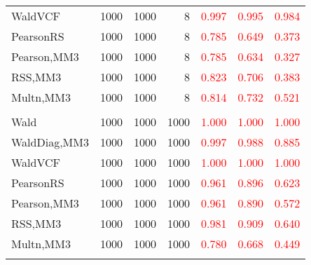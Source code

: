 \documentclass[
]{article}
\begin{document}
\begin{table}[H]
{\begin{tabular}[t]{lrrrrrr}
\hspace{1em}WaldVCF & 1000 & 1000 & 8 & \textcolor{red}{0.997} & \textcolor{red}{0.995} & \textcolor{red}{0.984}\\
\hspace{1em}PearsonRS & 1000 & 1000 & 8 & \textcolor{red}{0.785} & \textcolor{red}{0.649} & \textcolor{red}{0.373}\\
\hspace{1em}Pearson,MM3 & 1000 & 1000 & 8 & \textcolor{red}{0.785} & \textcolor{red}{0.634} & \textcolor{red}{0.327}\\
\hspace{1em}RSS,MM3 & 1000 & 1000 & 8 & \textcolor{red}{0.823} & \textcolor{red}{0.706} & \textcolor{red}{0.383}\\
\hspace{1em}Multn,MM3 & 1000 & 1000 & 8 & \textcolor{red}{0.814} & \textcolor{red}{0.732} & \textcolor{red}{0.521}\\
\addlinespace[0.3em]
\multicolumn{7}{l}{\textbf{1F 15V}}\\
\hspace{1em}Wald & 1000 & 1000 & 1000 & \textcolor{red}{1.000} & \textcolor{red}{1.000} & \vphantom{2} \textcolor{red}{1.000}\\
\hspace{1em}WaldDiag,MM3 & 1000 & 1000 & 1000 & \textcolor{red}{0.997} & \textcolor{red}{0.988} & \textcolor{red}{0.885}\\
\hspace{1em}WaldVCF & 1000 & 1000 & 1000 & \textcolor{red}{1.000} & \textcolor{red}{1.000} & \vphantom{1} \textcolor{red}{1.000}\\
\hspace{1em}PearsonRS & 1000 & 1000 & 1000 & \textcolor{red}{0.961} & \textcolor{red}{0.896} & \textcolor{red}{0.623}\\
\hspace{1em}Pearson,MM3 & 1000 & 1000 & 1000 & \textcolor{red}{0.961} & \textcolor{red}{0.890} & \textcolor{red}{0.572}\\
\hspace{1em}RSS,MM3 & 1000 & 1000 & 1000 & \textcolor{red}{0.981} & \textcolor{red}{0.909} & \textcolor{red}{0.640}\\
\hspace{1em}Multn,MM3 & 1000 & 1000 & 1000 & \textcolor{red}{0.780} & \textcolor{red}{0.668} & \textcolor{red}{0.449}\\
\addlinespace[0.3em]
\multicolumn{7}{l}{\textbf{2F 10V}}\\

\end{tabular}}
\end{table}
\end{document}
